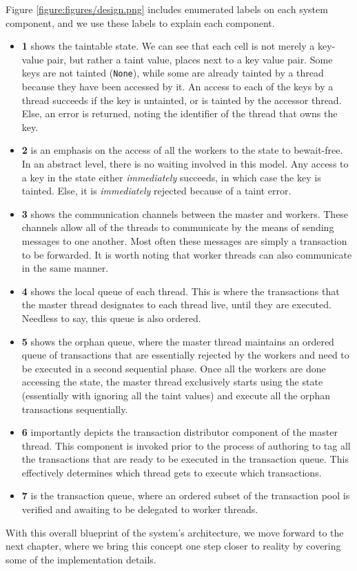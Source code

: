 
Figure \ref{figure:figures/design.png} includes enumerated labels on each system component, and we
use these labels to explain each component.

\begin{itemize}
	\item \textbf{1} shows the taintable state. We can see that each cell is not merely a key-value
	pair, but rather a taint value, places next to a key value pair. Some keys are not tainted
	(\texttt{None}), while some are already tainted by a thread because they have been accessed by
	it. An access to each of the keys by a thread succeeds if the key is untainted, or is
	tainted by the accessor thread. Else, an error is returned, noting the identifier of the thread
	that owns the key.
	\item \textbf{2} is an emphasis on the access of all the workers to the state to bewait-free. In an abstract level, there is no waiting involved
	in this model. Any access to a key in the state either \textit{immediately} succeeds, in
	which case the key is tainted. Else, it is \textit{immediately} rejected because of a taint
	error.
	\item \textbf{3} shows the communication channels between the master and workers. These channels
	allow all of the threads to communicate by the means of sending messages to one another. Most
	often these messages are simply a transaction to be forwarded. It is worth noting that worker
	threads can also communicate in the same manner.
	\item \textbf{4} shows the local queue of each thread. This is where the transactions that the
	master thread designates to each thread live, until they are executed. Needless to say, this
	queue is also ordered.
	\item \textbf{5} shows the orphan queue, where the master thread maintains an ordered queue of
	transactions that are essentially rejected by the workers and need to be executed in a second
	sequential phase. Once all the workers are done accessing the state, the master thread
	exclusively starts using the state (essentially with ignoring all the taint values) and execute
	all the orphan transactions sequentially.
	\item \textbf{6} importantly depicts the transaction distributor component of the master thread.
	This component is invoked prior to the process of authoring to tag all the transactions that are
	ready to be executed in the transaction queue. This effectively determines which thread gets to
	execute which transactions.
	\item \textbf{7} is the transaction queue, where an ordered subset of the transaction pool is
	verified and awaiting to be delegated to worker threads.
\end{itemize}

With this overall blueprint of the system's architecture, we move forward to the next chapter, where
we bring this concept one step closer to reality by covering some of the implementation
details.






